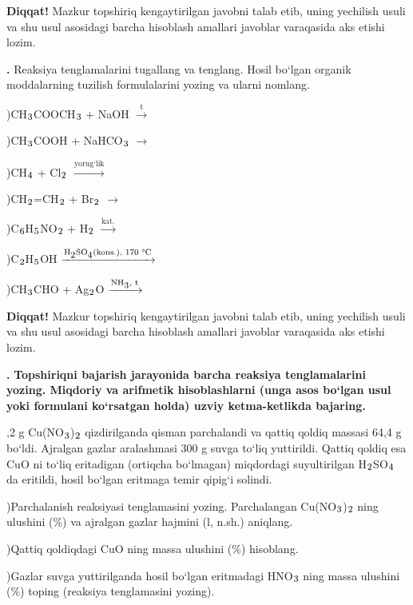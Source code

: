\documentclass[11pt,a4paper]{article}
\renewcommand{\textsubscript}[1]{\ensuremath{_{\text{\fontsize{8}{8}\selectfont #1}}}}
\newcommand{\qn}[1]{\textbf{\fontsize{11.5}{13}\selectfont #1}}
\newcommand{\qsep}{\par\vspace{1pt}\noindent\rule{0pt}{0.4pt}\par\vspace{5pt}}
\newcommand{\diqqat}[1]{\par\smallskip\noindent\textbf{Diqqat!} #1\par\medskip}
\begin{document}
\diqqat{Mazkur topshiriq kengaytirilgan javobni talab etib, uning yechilish usuli va shu usul asosidagi barcha hisoblash amallari javoblar varaqasida aks etishi lozim.}\qsep
\noindent\qn{42.} Reaksiya tenglamalarini tugallang va tenglang. Hosil bo`lgan organik moddalarning tuzilish formulalarini yozing va ularni nomlang.\par
{})CH\textsubscript{3}COOCH\textsubscript{3} + NaOH $\xrightarrow{\text{t}}$\par
{})CH\textsubscript{3}COOH + NaHCO\textsubscript{3} $\to$\par
{})CH\textsubscript{4} + Cl\textsubscript{2} $\xrightarrow{\text{yorug`lik}}$\par
{})CH\textsubscript{2}=CH\textsubscript{2} + Br\textsubscript{2} $\to$\par
{})C\textsubscript{6}H\textsubscript{5}NO\textsubscript{2} + H\textsubscript{2} $\xrightarrow{\text{kat.}}$\par
{})C\textsubscript{2}H\textsubscript{5}OH $\xrightarrow{\text{H\textsubscript{2}SO\textsubscript{4}(kons.), 170 \textdegree{}C}}$\par
{})CH\textsubscript{3}CHO + Ag\textsubscript{2}O $\xrightarrow{\text{NH\textsubscript{3}, t}}$\par
\diqqat{Mazkur topshiriq kengaytirilgan javobni talab etib, uning yechilish usuli va shu usul asosidagi barcha hisoblash amallari javoblar varaqasida aks etishi lozim.}\qsep
\noindent\qn{43.} \textbf{Topshiriqni bajarish jarayonida barcha reaksiya tenglamalarini yozing. Miqdoriy va arifmetik hisoblashlarni (unga asos bo`lgan usul yoki formulani ko`rsatgan holda) uzviy ketma-ketlikda bajaring.}\par{},2 g Cu(NO\textsubscript{3})\textsubscript{2} qizdirilganda qisman parchalandi va qattiq qoldiq massasi 64,4 g bo`ldi. Ajralgan gazlar aralashmasi 300 g suvga to`liq yuttirildi. Qattiq qoldiq esa CuO ni to`liq eritadigan (ortiqcha bo`lmagan) miqdordagi suyultirilgan H\textsubscript{2}SO\textsubscript{4} da eritildi, hosil bo`lgan eritmaga temir qipig`i solindi.\par
{})Parchalanish reaksiyasi tenglamasini yozing. Parchalangan Cu(NO\textsubscript{3})\textsubscript{2} ning ulushini (\%) va ajralgan gazlar hajmini (l, n.sh.) aniqlang.\par
{})Qattiq qoldiqdagi CuO ning massa ulushini (\%) hisoblang.\par
{})Gazlar suvga yuttirilganda hosil bo`lgan eritmadagi HNO\textsubscript{3} ning massa ulushini (\%) toping (reaksiya tenglamasini yozing).\par
\end{document}
